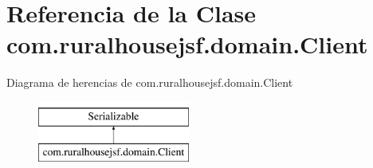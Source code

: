 \hypertarget{classcom_1_1ruralhousejsf_1_1domain_1_1_client}{}\section{Referencia de la Clase com.\+ruralhousejsf.\+domain.\+Client}
\label{classcom_1_1ruralhousejsf_1_1domain_1_1_client}
Diagrama de herencias de com.\+ruralhousejsf.\+domain.\+Client\begin{figure}[H]
\begin{center}
\leavevmode
\includegraphics[height=2.000000cm]{de/de3/classcom_1_1ruralhousejsf_1_1domain_1_1_client}
\end{center}
\end{figure}
